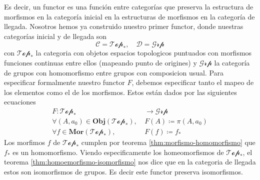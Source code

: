 {Es decir, un functor es una función entre categorías que preserva la
estructura de morfismos en la categoría inicial en la estructuras de
morfismos en la categoría de llegada. Nosotros hemos ya construido
nuestro primer functor, donde nuestras categorías inicial y de llegada son
\[ \mathcal C = \mathscr{Top}_* ,  \quad \mathcal D
  = \mathscr{Grp} \]
con \(\mathcal {Top}_*\) la categoria con objetos espacios topologicos
puntuados con morfismos funciones continuas entre ellos (mapeando punto de
origines) y \(\mathscr{Grp}\) la categoría de grupos con homomorfismo entre
grupos con composicion usual. Para especificar formalmente nuestro
functor \(F\), debemos especificar tanto el mapeo de los elementos como
el de los morfismos. Estos están dados por las siguientes ecuaciones
\begin{align*}
  F : \mathscr{Top}_* &\longrightarrow \mathscr{Grp} \\
  \forall (A, a_0) \in \mathbf{Obj} \left( \mathscr{Top}_* \right),\
    &F(A) \coloneqq \pi (A, a_0) \\
  \forall f \in \mathbf{Mor} \left( \mathscr{Top}_* \right),\ &F(f) \coloneqq
    f_*
\end{align*}
Los morfimos \(f\) de \(\mathscr{Top}_*\) cumplen por teorema
\ref{thm:morfismo-homomorfismo} que \(f_*\) es un homomorfismo. Viendo
especificamente los homeomorfismos de \(\mathscr{Top}_*\),
el teorema \ref{thm:homoemorfismo-isomorfismo} nos dice que en la
categoria de llegada estos son isomorfismos de grupos. Es decir este
functor preserva isomorfismos.
}